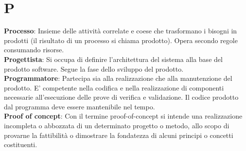 \section{P}
\textbf{Processo}: Insieme delle attività correlate e coese che trasformano i bisogni in prodotti (il risultato di un processo si
chiama prodotto). Opera secondo regole consumando risorse.\\
\textbf{Progettista}: Si occupa di definire l'architettura del sistema alla base del prodotto software. Segue la fase dello sviluppo del prodotto.\\
\textbf{Programmatore}: Partecipa sia alla realizzazione che alla manutenzione del prodotto. E' competente nella codifica e nella realizzazione di componenti necessarie all’esecuzione delle prove di verifica e validazione. Il codice prodotto dal
programma deve essere mantenibile nel tempo.\\
\textbf{Proof of concept}: Con il termine proof-of-concept si intende una realizzazione incompleta o abbozzata di un determinato progetto o metodo, allo scopo di provarne la fattibilità o dimostrare la fondatezza di alcuni principi o concetti costituenti.\\
